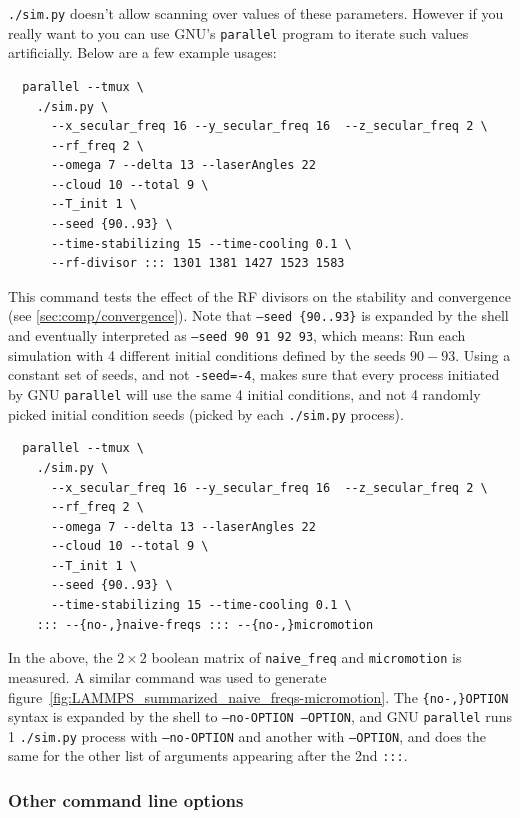 \texttt{./sim.py} doesn't allow scanning over values of these parameters. However if you really want to you can use GNU's \texttt{parallel}\cite{GNUParallel} program to iterate such values artificially. Below are a few example usages:

\begin{verbatim}
  parallel --tmux \
    ./sim.py \
      --x_secular_freq 16 --y_secular_freq 16  --z_secular_freq 2 \
      --rf_freq 2 \
      --omega 7 --delta 13 --laserAngles 22 
      --cloud 10 --total 9 \
      --T_init 1 \
      --seed {90..93} \
      --time-stabilizing 15 --time-cooling 0.1 \
      --rf-divisor ::: 1301 1381 1427 1523 1583
\end{verbatim}

This command tests the effect of the RF divisors on the stability and convergence (see \ref{sec:comp/convergence}). Note that \texttt{--seed \{90..93\}} is expanded by the shell and eventually interpreted as \texttt{--seed 90 91 92 93}, which means: Run each simulation with 4 different initial conditions defined by the seeds $90-93$. Using a constant set of seeds, and not \texttt{-seed=-4}, makes sure that every process initiated by GNU \texttt{parallel} will use the same 4 initial conditions, and not 4 randomly picked initial condition seeds (picked by each \texttt{./sim.py} process).

\begin{verbatim}
  parallel --tmux \
    ./sim.py \
      --x_secular_freq 16 --y_secular_freq 16  --z_secular_freq 2 \
      --rf_freq 2 \
      --omega 7 --delta 13 --laserAngles 22 
      --cloud 10 --total 9 \
      --T_init 1 \
      --seed {90..93} \
      --time-stabilizing 15 --time-cooling 0.1 \
    ::: --{no-,}naive-freqs ::: --{no-,}micromotion
\end{verbatim}

In the above, the $2\times 2$ boolean matrix of \texttt{naive\_freq} and \texttt{micromotion} is measured. A similar command was used to generate figure~\ref{fig:LAMMPS_summarized_naive_freqs-micromotion}. The \texttt{\{no-,\}OPTION} syntax is expanded by the shell to \texttt{--no-OPTION --OPTION}, and GNU \texttt{parallel} runs 1 \texttt{./sim.py} process with \texttt{--no-OPTION} and another with \texttt{--OPTION}, and does the same for the other list of arguments appearing after the 2nd \texttt{:::}.

\subsubsection{Other command line options}

